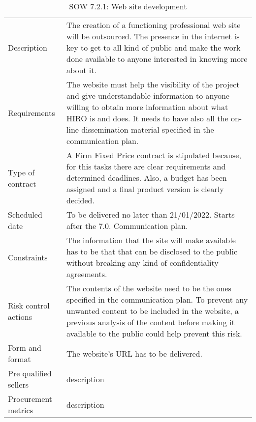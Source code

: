 \begin{table}[H]
	\centering
	\begin{tabular}
		{>{\raggedright\arraybackslash}p{3cm} >{\arraybackslash}p{11cm}}
		
		\toprule[2pt]
		
		\multicolumn{2}{c}{\textbf{SOW - 7.2.1. Web site development}}\\
		
		\midrule[1.5pt]
		
		Description & The creation of a functioning professional web site will be outsourced. The presence in the internet is key to get to all kind of public and make the work done available to anyone interested in knowing more about it. \\
		\hline
		
		Requirements & The website must help the visibility of the project and give understandable information to anyone willing to obtain more information about what HIRO is and does. It needs to have also all the on-line dissemination material specified in the communication plan.\\
		\hline
		
		Type of contract & A Firm Fixed Price contract is stipulated because, for this tasks there are clear requirements and determined deadlines. Also, a budget has been assigned and a final product version is clearly decided.\\
		\hline
		
		Scheduled date & To be delivered no later than 21/01/2022. Starts after the 7.0. Communication plan.\\
		\hline
		
		Constraints & The information that the site will make available has to be that that can be disclosed to the public without breaking any kind of confidentiality agreements.\\
		\hline
		
		Risk control actions & The contents of the website need to be the ones specified in the communication plan. To prevent any unwanted content to be included in the website, a previous analysis of the content before making it available to the public could help prevent this risk.\\
		\hline
		
		Form and format & The website's URL has to be delivered.\\
		\hline
		
		Pre qualified sellers & description\\
		\hline
		
		Procurement metrics & description\\
		
		\bottomrule[2pt]		
		
	\end{tabular}
	\caption{SOW 7.2.1: Web site development}
\end{table}

